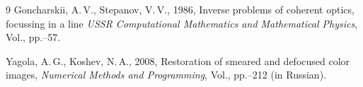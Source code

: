 \documentclass{procDDs}
\begin{document}
\begin {thebibliography}{9}
  Goncharskii, A.\,V., Stepanov, V.\,V., 1986,
			Inverse problems of coherent optics, focussing in a line
			\emph{USSR Computational Mathematics and Mathematical Physics},
			Vol., pp.--57.
			
 Yagola, A.\,G., Koshev, N.\,A., 2008,
			Restoration of smeared and defocused color images, 
			\emph{Numerical Methods and Programming},
			Vol., pp.–212 (in Russian).

\end{thebibliography}
\end{document}

